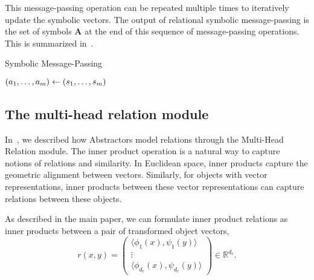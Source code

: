 This message-passing operation can be repeated multiple times to iteratively update the symbolic vectors.  The output of relational symbolic message-passing is the set of symbols $\bm{A}$ at the end of this sequence of message-passing operations. This is summarized in~.

\begin{algorithm}[ht!]
	\caption{Symbolic Message-Passing}\label{alg:symbolic_mp}

	\vspace{1em}

	\((a_1, \ldots, a_m) \gets (s_1, \ldots, s_m)\)

\end{algorithm}

\subsection{The multi-head relation module}

In~, we described how Abstractors model relations through the Multi-Head Relation module. The inner product operation is a natural way to capture notions of relations and similarity. In Euclidean space, inner products capture the geometric alignment between vectors. Similarly, for objects with vector representations, inner products between these vector representations can capture relations between these objects.

As described in the main paper, we can formulate inner product relations as inner products between a pair of transformed object vectors,
\begin{equation}\label{eq:inner_prod_rel_supp}
    r(x,y) = \begin{pmatrix}\langle \phi_1(x), \psi_1(y) \rangle \\ \vdots \\ \langle \phi_{d_r}(x), \psi_{d_r}(y) \rangle \end{pmatrix} \in \mathbb{R}^{d_r}.
\end{equation}

